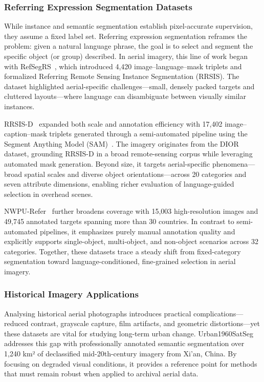 \subsubsection{Referring Expression Segmentation Datasets}

While instance and semantic segmentation establish pixel-accurate supervision, they assume a fixed label set. Referring expression segmentation reframes the problem: given a natural language phrase, the goal is to select and segment the specific object (or group) described. In aerial imagery, this line of work began with RefSegRS~\cite{yuan2023rrsis}, which introduced 4,420 image–language–mask triplets and formalized Referring Remote Sensing Instance Segmentation (RRSIS). The dataset highlighted aerial-specific challenges—small, densely packed targets and cluttered layouts—where language can disambiguate between visually similar instances.

RRSIS-D~\cite{liu2024rotated} expanded both scale and annotation efficiency with 17,402 image–caption–mask triplets generated through a semi-automated pipeline using the Segment Anything Model (SAM)~\cite{sam}. The imagery originates from the DIOR dataset, grounding RRSIS-D in a broad remote-sensing corpus while leveraging automated mask generation. Beyond size, it targets aerial-specific phenomena—broad spatial scales and diverse object orientations—across 20 categories and seven attribute dimensions, enabling richer evaluation of language-guided selection in overhead scenes.

NWPU-Refer~\cite{yang2024large} further broadens coverage with 15,003 high-resolution images and 49,745 annotated targets spanning more than 30 countries. In contrast to semi-automated pipelines, it emphasizes purely manual annotation quality and explicitly supports single-object, multi-object, and non-object scenarios across 32 categories. Together, these datasets trace a steady shift from fixed-category segmentation toward language-conditioned, fine-grained selection in aerial imagery.

\subsubsection{Historical Imagery Applications}

Analysing historical aerial photographs introduces practical complications—reduced contrast, grayscale capture, film artifacts, and geometric distortions—yet these datasets are vital for studying long-term urban change. Urban1960SatSeg~\cite{hao2025urban1960satseg} addresses this gap with professionally annotated semantic segmentation over 1,240 km² of declassified mid-20th-century imagery from Xi'an, China. By focusing on degraded visual conditions, it provides a reference point for methods that must remain robust when applied to archival aerial data.

